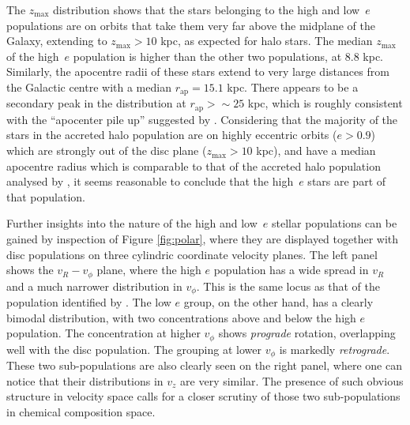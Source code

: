 The $z_\mathrm{max}$ distribution shows that the stars belonging
to the high and low~$e$ populations are on orbits that take them
very far above the midplane of the Galaxy, extending to $z_\mathrm{max}>10$
kpc, as expected for halo stars. The median $z_\mathrm{max}$ of the
high~$e$ population is higher than the other two populations, at
8.8 kpc. Similarly, the apocentre radii of these stars extend to
very large distances from the Galactic centre with a median
$r_\mathrm{ap} = 15.1$ kpc.  There appears to be a secondary peak
in the distribution at $r_\mathrm{ap} >\sim25$ kpc, which is roughly
consistent with the ``apocenter pile up'' suggested by
\citet{2018arXiv180510288D}.  Considering that the majority of the
stars in the accreted halo population are on highly eccentric orbits
($e > 0.9$) which are strongly out of the disc plane ($z_\mathrm{max}
> 10$ kpc), and have a median apocentre radius which is comparable
to that of the accreted halo population analysed by
\citet{2018arXiv180510288D}, it seems reasonable to conclude that
the high~$e$ stars are part of that population.

Further insights into the nature of the high and low~$e$ stellar
populations can be gained by inspection of Figure \ref{fig:polar},
where they are displayed together with disc populations on three
cylindric coordinate velocity planes.  The left panel shows
the $v_R-v_\phi$ plane, where the high $e$ population has a wide
spread in $v_R$ and a much narrower distribution in $v_\phi$.  This
is the same locus as that of the population identified by \citet[][their
Figure 2]{2018MNRAS.478..611B}.  The low $e$ group, on the other
hand, has a clearly bimodal distribution, with two concentrations
above and below the high $e$ population.  The concentration at
higher $v_\phi$ shows {\it prograde} rotation, overlapping well
with the disc population.  The grouping at lower $v_\phi$ is markedly
{\it retrograde}.  These two sub-populations are also clearly seen
on the right panel, where one can notice that their distributions
in $v_z$ are very similar.  The presence of such obvious structure
in velocity space calls for a closer scrutiny of those two
sub-populations in chemical composition space.

